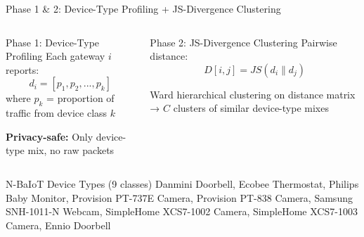 \documentclass[10pt, aspectratio=169]{beamer}
\begin{document}
\begin{frame}[t]{Phase 1 \& 2: Device-Type Profiling + JS-Divergence Clustering}
    \begin{columns}
        \begin{block}{Phase 1: Device-Type Profiling}
            Each gateway $i$ reports:
            \begin{equation*}
            d_i = [p_1, p_2, ..., p_k]
            \end{equation*}
            where $p_k$ = proportion of traffic from device class $k$
            
            \vspace{0.3cm}
            \textbf{Privacy-safe:} Only device-type mix, no raw packets
        \end{block}
        
        \begin{block}{Phase 2: JS-Divergence Clustering}
            Pairwise distance:
            \begin{equation*}
            D[i,j] = JS(d_i \| d_j)
            \end{equation*}
            
            \vspace{0.3cm}
            Ward hierarchical clustering on distance matrix → $C$ clusters of similar device-type mixes
        \end{block}
    \end{columns}
    
    \vspace{0.5cm}
    
    \begin{alertblock}{N-BaIoT Device Types (9 classes)}
        Danmini Doorbell, Ecobee Thermostat, Philips Baby Monitor, Provision PT-737E Camera, Provision PT-838 Camera, Samsung SNH-1011-N Webcam, SimpleHome XCS7-1002 Camera, SimpleHome XCS7-1003 Camera, Ennio Doorbell
    \end{alertblock}
\end{frame}
\end{document}
